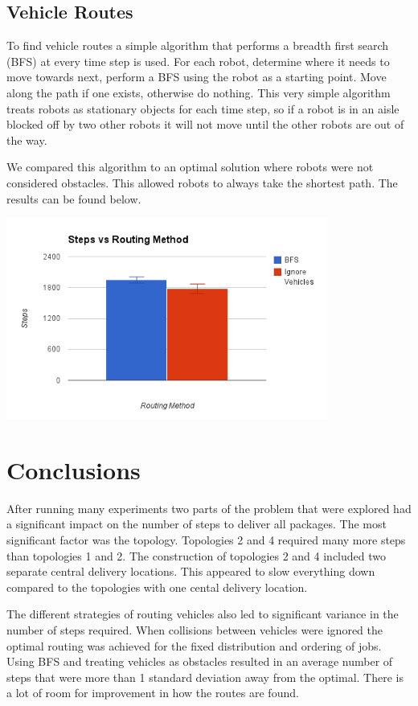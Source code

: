 \documentclass[11pt]{article}
\begin{document}
\subsection{Vehicle Routes}

To find vehicle routes a simple algorithm that performs a breadth first search (BFS) \cite{CLR} at every time step is used. For each robot, determine where it needs to move towards next, perform a BFS using the robot as a starting point. Move along the path if one exists, otherwise do nothing. This very simple algorithm treats robots as stationary objects for each time step, so if a robot is in an aisle blocked off by two other robots it will not move until the other robots are out of the way.

We compared this algorithm to an optimal solution where robots were not considered obstacles. This allowed robots to always take the shortest path. The results can be found below.

\begin{center}
\includegraphics[height=250px]{routing_chart.png}
\end{center}

\section{Conclusions}

After running many experiments two parts of the problem that were explored had a significant impact on the number of steps to deliver all packages. The most significant factor was the topology. Topologies 2 and 4 required many more steps than topologies 1 and 2. The construction of topologies 2 and 4 included two separate central delivery locations. This appeared to slow everything down compared to the topologies with one cental delivery location.

The different strategies of routing vehicles also led to significant variance in the number of steps required. When collisions between vehicles were ignored the optimal routing was achieved for the fixed distribution and ordering of jobs. Using BFS and treating vehicles as obstacles resulted in an average number of steps that were more than 1 standard deviation away from the optimal. There is a lot of room for improvement in how the routes are found.
\end{document}
